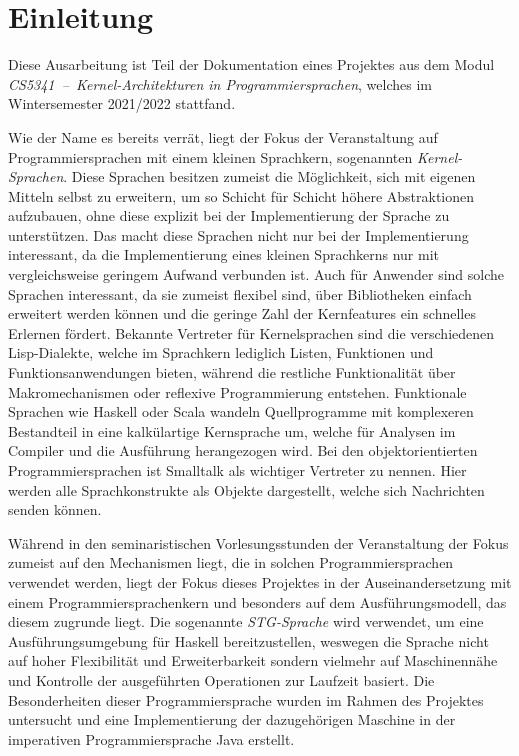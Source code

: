 
\chapter{Einleitung}

Diese Ausarbeitung ist Teil der Dokumentation eines Projektes aus dem Modul \textit{CS5341~--~Kernel-Architekturen in Programmiersprachen}, welches im Wintersemester 2021/2022 stattfand.

Wie der Name es bereits verrät, liegt der Fokus der Veranstaltung auf Programmiersprachen mit einem kleinen Sprachkern, sogenannten \textit{Kernel-Sprachen}.
Diese Sprachen besitzen zumeist die Möglichkeit, sich mit eigenen Mitteln selbst zu erweitern, um so Schicht für Schicht höhere Abstraktionen aufzubauen, ohne diese explizit bei der Implementierung der Sprache zu unterstützen.
Das macht diese Sprachen nicht nur bei der Implementierung interessant, da die Implementierung eines kleinen Sprachkerns nur mit vergleichsweise geringem Aufwand verbunden ist.
Auch für Anwender sind solche Sprachen interessant, da sie zumeist flexibel sind, über Bibliotheken einfach erweitert werden können und die geringe Zahl der Kernfeatures ein schnelles Erlernen fördert.
Bekannte Vertreter für Kernelsprachen sind die verschiedenen Lisp-Dialekte, welche im Sprachkern lediglich Listen, Funktionen und Funktionsanwendungen bieten, während die restliche Funktionalität über Makromechanismen oder reflexive Programmierung entstehen.
Funktionale Sprachen wie Haskell oder Scala wandeln Quellprogramme mit komplexeren Bestandteil in eine kalkülartige Kernsprache um, welche für Analysen im Compiler und die Ausführung herangezogen wird.
Bei den objektorientierten Programmiersprachen ist Smalltalk als wichtiger Vertreter zu nennen.
Hier werden alle Sprachkonstrukte als Objekte dargestellt, welche sich Nachrichten senden können.

Während in den seminaristischen Vorlesungsstunden der Veranstaltung der Fokus zumeist auf den Mechanismen liegt, die in solchen Programmiersprachen verwendet werden, liegt der Fokus dieses Projektes in der Auseinandersetzung mit einem Programmiersprachenkern und besonders auf dem Ausführungsmodell, das diesem zugrunde liegt.
Die sogenannte \textit{STG-Sprache} wird verwendet, um eine Ausführungsumgebung für Haskell bereitzustellen, weswegen die Sprache nicht auf hoher Flexibilität und Erweiterbarkeit sondern vielmehr auf Maschinennähe und Kontrolle der ausgeführten Operationen zur Laufzeit basiert.
Die Besonderheiten dieser Programmiersprache wurden im Rahmen des Projektes untersucht und eine Implementierung der dazugehörigen Maschine in der imperativen Programmiersprache Java erstellt.

